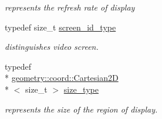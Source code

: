 \begin{DoxyCompactItemize}
\begin{DoxyCompactList}\small\item\em represents the refresh rate of display \end{DoxyCompactList}\item 
\hypertarget{namespacehryky_1_1display_a09f7398edae025e4ee4e505b5cdf954c}{typedef size\-\_\-t \hyperlink{namespacehryky_1_1display_a09f7398edae025e4ee4e505b5cdf954c}{screen\-\_\-id\-\_\-type}}\label{namespacehryky_1_1display_a09f7398edae025e4ee4e505b5cdf954c}

\begin{DoxyCompactList}\small\item\em distinguishes video screen. \end{DoxyCompactList}\item 
\hypertarget{namespacehryky_1_1display_a88ee3bfa154cce4c6715af0c3f53d062}{typedef \\*
\hyperlink{classhryky_1_1geometry_1_1coord_1_1_cartesian2_d}{geometry\-::coord\-::\-Cartesian2\-D}\\*
$<$ size\-\_\-t $>$ \hyperlink{namespacehryky_1_1display_a88ee3bfa154cce4c6715af0c3f53d062}{size\-\_\-type}}\label{namespacehryky_1_1display_a88ee3bfa154cce4c6715af0c3f53d062}

\begin{DoxyCompactList}\small\item\em represents the size of the region of display. \end{DoxyCompactList}\end{DoxyCompactItemize}
